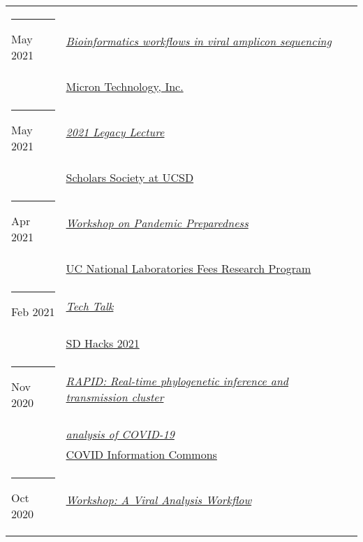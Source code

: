 \documentclass[margin,line]{res}
\begin{document}
\begin{resume}
\begin{longtable}{@{}p{0.7in}p{4in}}
\hspace*{-4mm} \rule{-1mm}{5mm} May 2021 & \href{https://www.micron.com/}{\textit{Bioinformatics workflows in viral amplicon sequencing}}\\*
\hspace*{-4mm} & \hspace{4mm} \href{https://www.micron.com/}{Micron Technology, Inc.}\\
\hspace*{-4mm} \rule{-1mm}{5mm} May 2021 & \href{https://studentorg.ucsd.edu/Home/Details/12340}{\textit{2021 Legacy Lecture}}\\*
\hspace*{-4mm} & \hspace{4mm} \href{https://studentorg.ucsd.edu/Home/Details/12340}{Scholars Society at UCSD}\\
\hspace*{-4mm} \rule{-1mm}{5mm} Apr 2021 & \href{https://www.ucop.edu/research-initiatives/programs/lab-fees/workshops.html}{\textit{Workshop on Pandemic Preparedness}}\\*
\hspace*{-4mm} & \hspace{4mm} \href{https://www.ucop.edu/research-initiatives/programs/lab-fees/index.html}{UC National Laboratories Fees Research Program}\\
\hspace*{-4mm} \rule{-1mm}{5mm} Feb 2021 & \href{https://www.sdhacks.io/}{\textit{Tech Talk}}\\*
\hspace*{-4mm} & \hspace{4mm} \href{https://www.sdhacks.io/}{SD Hacks 2021}\\
\hspace*{-4mm} \rule{-1mm}{5mm} Nov 2020 & \href{https://www.youtube.com/watch?v=6-fDbTY8ySI}{\textit{RAPID: Real-time phylogenetic inference and transmission cluster}}\\*
\hspace*{-4mm} & \hspace{4mm} \href{https://www.youtube.com/watch?v=6-fDbTY8ySI}{\textit{analysis of COVID-19}}\\*
\hspace*{-4mm} & \hspace{4mm} \href{https://covidinfocommons.datascience.columbia.edu/}{COVID Information Commons}\\
\hspace*{-4mm} \rule{-1mm}{5mm} Oct 2020 & \href{https://www.theopencode.org/a-viral-analysis-workflow/}{\textit{Workshop: A Viral Analysis Workflow}}\\*

\end{longtable}
\end{resume}
\end{document}
